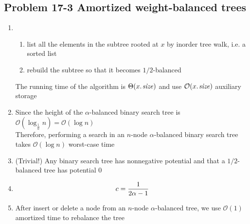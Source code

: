 \subsection*{Problem 17-3 Amortized weight-balanced trees}
\begin{enumerate}
	\item	\begin{enumerate}
			\item	list all the elements in the subtree rooted at $x$ by inorder tree walk, i.e. a sorted list
			\item	rebuild the subtree so that it becomes $1/2$-balanced
		\end{enumerate}
		The running time of the algorithm is $\Theta(\attrib{x}{size})$ and use $\mathcal{O}(\attrib{x}{size})$ auxiliary storage
	\item	Since the height of the $\alpha$-balanced binary search tree is $\mathcal{O}(\log_{\frac{1}{\alpha}} n) = \mathcal{O}(\log n)$ \\
		Therefore, performing a search in an $n$-node $\alpha$-balanced binary search tree takes $\mathcal{O}(\log n)$ worst-case time
	\item	(Trivial!) Any binary search tree has nonnegative potential and that a $1/2$-balanced tree has potential 0
	\item	\begin{equation} \notag
			c = \frac{1}{2\alpha - 1}
		\end{equation}
	\item	After insert or delete a node from an $n$-node $\alpha$-balanced tree, we use $\mathcal{O}(1)$ amortized time to rebalance the tree
\end{enumerate}

